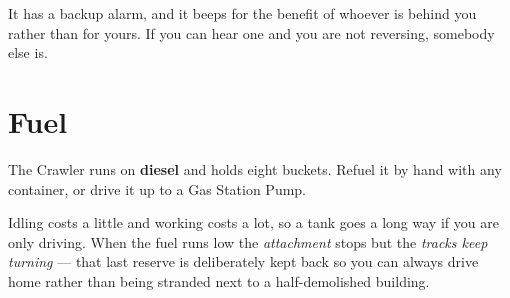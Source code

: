 \begin{ietip}
It has a backup alarm, and it beeps for the benefit of whoever is behind you rather than for yours.
If you can hear one and you are not reversing, somebody else is.
\end{ietip}

\section{Fuel}

The Crawler runs on \textbf{diesel} and holds eight buckets. Refuel it by hand with any container, or
drive it up to a Gas Station Pump.

Idling costs a little and working costs a lot, so a tank goes a long way if you are only driving.
When the fuel runs low the \emph{attachment} stops but the \emph{tracks keep turning} --- that last
reserve is deliberately kept back so you can always drive home rather than being stranded next to a
half-demolished building.
